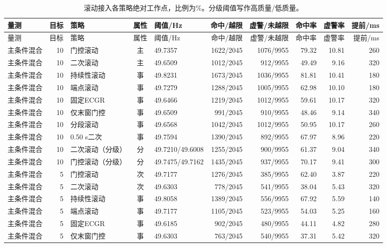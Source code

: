 \documentclass[UTF8,a4paper,11pt]{ctexart}
\begin{document}
\begingroup\scriptsize\setlength{\tabcolsep}{3pt}
\begin{longtable}{lrlclrrrrr}
\caption{滚动接入各策略绝对工作点，比例为\%。分级阈值写作高质量/低质量。}\label{tab:transfer-full}\\
\toprule
量测 & 目标 & 策略 & 属性 & 阈值/Hz & 命中/越限 & 虚警/未越限 & 命中率 & 虚警率 & 提前/ms \\
\midrule\endfirsthead
\toprule
量测 & 目标 & 策略 & 属性 & 阈值/Hz & 命中/越限 & 虚警/未越限 & 命中率 & 虚警率 & 提前/ms \\
\midrule\endhead
\bottomrule\endfoot
主条件混合 & 10 & 门控滚动 & 主 & 49.7357 & 1622/2045 & 1076/9955 & 79.32 & 10.81 & 260 \\
主条件混合 & 10 & 二次滚动 & 主 & 49.6509 & 1012/2045 & 912/9955 & 49.49 & 9.16 & 320 \\
主条件混合 & 10 & 持续性滚动 & 事 & 49.8231 & 1673/2045 & 1036/9955 & 81.81 & 10.41 & 180 \\
主条件混合 & 10 & 端点滚动 & 事 & 49.7279 & 1288/2045 & 1005/9955 & 62.98 & 10.10 & 180 \\
主条件混合 & 10 & 固定ECGR & 事 & 49.6466 & 1219/2045 & 1012/9955 & 59.61 & 10.17 & 320 \\
主条件混合 & 10 & 仅末窗门控 & 事 & 49.6509 & 991/2045 & 910/9955 & 48.46 & 9.14 & 340 \\
主条件混合 & 10 & 分段滚动 & 事 & 49.6568 & 1042/2045 & 1012/9955 & 50.95 & 10.17 & 260 \\
主条件混合 & 10 & 0.50 s二次 & 事 & 49.7594 & 1390/2045 & 892/9955 & 67.97 & 8.96 & 220 \\
主条件混合 & 10 & 二次滚动（分级） & 分 & 49.7210/49.6008 & 1255/2045 & 900/9955 & 61.37 & 9.04 & 340 \\
主条件混合 & 10 & 门控滚动（分级） & 分 & 49.7475/49.7162 & 1435/2045 & 937/9955 & 70.17 & 9.41 & 300 \\
主条件混合 & 5 & 门控滚动 & 次 & 49.7177 & 1276/2045 & 385/9955 & 62.40 & 3.87 & 220 \\
主条件混合 & 5 & 二次滚动 & 次 & 49.6303 & 778/2045 & 541/9955 & 38.04 & 5.43 & 320 \\
主条件混合 & 5 & 持续性滚动 & 事 & 49.8058 & 1389/2045 & 556/9955 & 67.92 & 5.59 & 140 \\
主条件混合 & 5 & 端点滚动 & 事 & 49.7177 & 1105/2045 & 523/9955 & 54.03 & 5.25 & 160 \\
主条件混合 & 5 & 固定ECGR & 事 & 49.6185 & 902/2045 & 480/9955 & 44.11 & 4.82 & 280 \\
主条件混合 & 5 & 仅末窗门控 & 事 & 49.6303 & 763/2045 & 540/9955 & 37.31 & 5.42 & 320 \\

\end{longtable}
\end{document}
